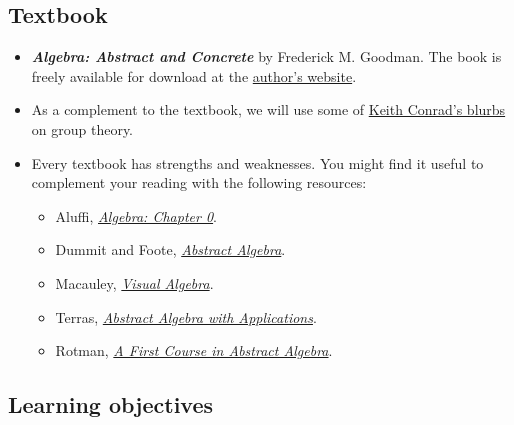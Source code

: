 \documentclass[11pt]{article}
\begin{document}
\subsection*{Textbook}
\label{sec:orgba38f80}
\begin{itemize}
\item \textbf{\emph{Algebra: Abstract and Concrete}} by Frederick M. Goodman. The book is
freely available for download at the \href{https://homepage.divms.uiowa.edu/\~goodman/algebrabook.dir/algebrabook.html}{author's website}.
\item As a complement to the textbook, we will use some of \href{https://kconrad.math.uconn.edu/blurbs/}{Keith Conrad's blurbs} on
group theory.
\item Every textbook has strengths and weaknesses. You might find it useful to
complement your reading with the following resources:
\begin{itemize}
\item Aluffi, \href{https://bookstore.ams.org/gsm-104}{\emph{Algebra: Chapter 0}}.
\item Dummit and Foote, \href{https://books.google.com.co/books/about/Abstract\_Algebra.html?id=KJDBQgAACAAJ\&redir\_esc=y}{\emph{Abstract Algebra}}.
\item Macauley, \href{https://www.math.clemson.edu/\~macaule/visualalgebra.html}{\emph{Visual Algebra}}.
\item Terras, \href{https://books.google.com.co/books/about/Abstract\_Algebra\_with\_Applications.html?id=znWIDwAAQBAJ\&redir\_esc=y}{\emph{Abstract Algebra with Applications}}.
\item Rotman, \href{https://books.google.com.co/books/about/A\_First\_Course\_in\_Abstract\_Algebra.html?id=ctEZAQAAIAAJ\&redir\_esc=y}{\emph{A First Course in Abstract Algebra}}.
\end{itemize}
\end{itemize}

\subsection*{Learning objectives}
\label{sec:org2102cd8}
\end{document}
